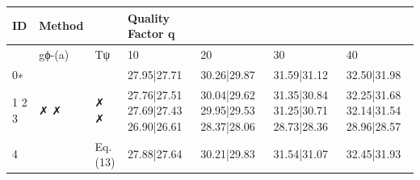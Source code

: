 \begin{tabular}{lllllll}
\toprule
ID & Method &  & Quality Factor q &  &  &  \\
\midrule
 & gϕ-(a) & Tψ & 10 & 20 & 30 & 40 \\
0∗ &  &  & 27.95|27.71 & 30.26|29.87 & 31.59|31.12 & 32.50|31.98 \\
1 2 3 & ✗ ✗ & ✗ ✗ & 27.76|27.51 27.69|27.43 26.90|26.61 & 30.04|29.62 29.95|29.53 28.37|28.06 & 31.35|30.84 31.25|30.71 28.73|28.36 & 32.25|31.68 32.14|31.54 28.96|28.57 \\
4 &  & Eq. (13) & 27.88|27.64 & 30.21|29.83 & 31.54|31.07 & 32.45|31.93 \\
\bottomrule
\end{tabular}
